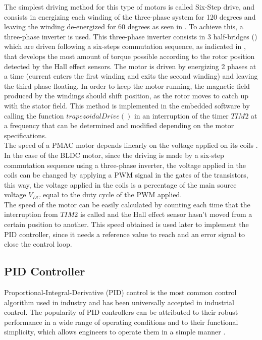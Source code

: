 The simplest driving method for this type of motors is called Six-Step drive, and consists in energizing each winding of the three-phase system for 120 degrees and leaving the winding de-energized for 60 degrees as seen in . To achieve this, a three-phase inverter is used. This three-phase inverter consists in 3 half-bridges () which are driven following a six-steps commutation sequence, as indicated in , that develops the most amount of torque possible according to the rotor position detected by the Hall effect sensors. The motor is driven by energizing 2 phases at a time (current enters the first winding and exits the second winding) and leaving the third phase floating. In order to keep the motor running, the magnetic field produced by the windings should shift position, as the rotor moves to catch up with the stator field. This method is implemented in the embedded software by calling the function $trapezoidalDrive()$ in an interruption of the timer $TIM2$ at a frequency that can be determined and modified depending on the motor specifications.\\

The speed of a PMAC motor depends linearly on the voltage applied on its coils \cite{GhioniElecDrives}. In the case of the BLDC motor, since the driving is made by a six-step commutation sequence using a three-phase inverter, the voltage applied in the coils can be changed by applying a PWM signal in the gates of the transistors, this way, the voltage applied in the coils is a percentage of the main source voltage $V_{DC}$ equal to the duty cycle of the PWM applied.\\


The speed of the motor can be easily calculated by counting each time that the interruption from $TIM2$ is called and the Hall effect sensor hasn't moved from a certain position to another. This speed obtained is used later to implement the PID controller, since it needs a reference value to reach and an error signal to close the control loop.

\subsection{PID Controller}
Proportional-Integral-Derivative (PID) control is the most common control algorithm used in industry and has been universally accepted in industrial control. The popularity of PID controllers can be attributed to their robust performance in a wide range of operating conditions and to their functional simplicity, which allows engineers to operate them in a simple manner \cite{NIPID}.\\

